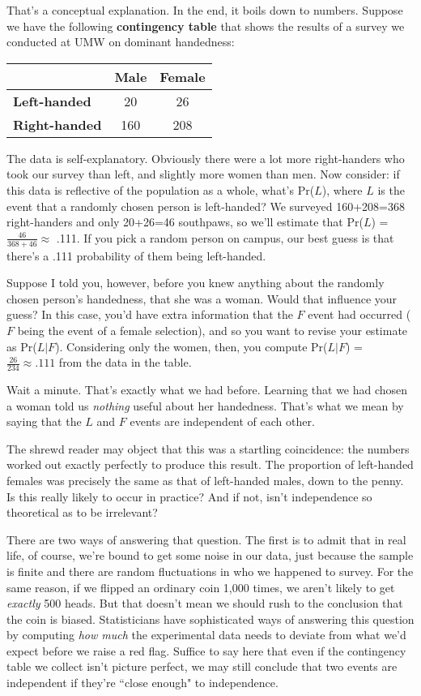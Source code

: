 That's a conceptual explanation. In the end, it boils down to numbers.
Suppose we have the following \textbf{contingency table} that shows the
results of a survey we conducted at UMW on dominant handedness:

\begin{center}
\begin{tabular}{|l|c|c|}
\hline
& \textbf{Male} & \textbf{Female} \\
\hline
\textbf{Left-handed} & 20 & 26 \\
\hline
\textbf{Right-handed} & 160 & 208 \\
\hline
\end{tabular}
\end{center}

The data is self-explanatory. Obviously there were a lot more right-handers
who took our survey than left, and slightly more women than men. Now
consider: if this data is reflective of the population as a whole, what's
Pr($L$), where $L$ is the event that a randomly chosen person is
left-handed? We surveyed 160+208=368 right-handers and only 20+26=46
southpaws, so we'll estimate that Pr($L$) = $\frac{46}{368+46} \approx$
.111. If you pick a random person on campus, our best guess is that there's
a .111 probability of them being left-handed.

Suppose I told you, however, before you knew anything about the randomly
chosen person's handedness, that she was a woman. Would that influence your
guess? In this case, you'd have extra information that the $F$ event had
occurred ($F$ being the event of a female selection), and so you want to
revise your estimate as Pr($L|F$). Considering only the women, then, you
compute Pr($L|F$) = $\frac{26}{234} \approx .111$ from the data in the
table.

Wait a minute. That's exactly what we had before. Learning that we had
chosen a woman told us \textit{nothing} useful about her handedness. That's
what we mean by saying that the $L$ and $F$ events are independent of each
other.

The shrewd reader may object that this was a startling coincidence: the
numbers worked out exactly perfectly to produce this result. The proportion
of left-handed females was precisely the same as that of left-handed males,
down to the penny. Is this really likely to occur in practice? And if not,
isn't independence so theoretical as to be irrelevant?

There are two ways of answering that question. The first is to admit that
in real life, of course, we're bound to get some noise in our data, just
because the sample is finite and there are random fluctuations in who we
happened to survey. For the same reason, if we flipped an ordinary coin
1,000 times, we aren't likely to get \textit{exactly} 500 heads. But that
doesn't mean we should rush to the conclusion that the coin is biased.
Statisticians have sophisticated ways of answering this question by
computing \textit{how much} the experimental data needs to deviate from
what we'd expect before we raise a red flag. Suffice to say here that even
if the contingency table we collect isn't picture perfect, we may still
conclude that two events are independent if they're ``close enough" to
independence.

